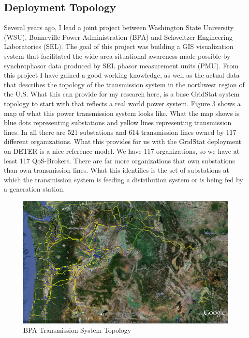 \documentclass{article}
\begin{document}
\subsection {Deployment Topology}


Several years ago, I lead a joint project between Washington State University (WSU), 
Bonneville Power Administration (BPA) and Schweitzer Engineering Laboratories (SEL). 
 The goal of this project was building a GIS visualization system that facilitated the 
wide-area situational awareness made possible by synchrophasor data produced by SEL
 phasor measurement units (PMU).  From this project I have gained a good working 
knowledge, as well as the actual data that describes the topology of the transmission
 system in the northwest region of the U.S.  What this can provide for my research here,
 is a base GridStat system topology to start with that reflects a real world power 
system.  Figure 3 shows a map of what this power transmission system looks like.  What
 the map shows is blue dots representing substations and yellow lines representing 
transmission lines.  In all there are 521 substations and 614 transmission lines owned 
by 117 different organizations.  What this provides for us with the GridStat deployment 
on DETER is a nice reference model.  We have 117 organizations, so we have at least 117 
QoS-Brokers.  There are far more organizations that own substations than own 
transmission lines.  What this identifies is the set of substations at which the 
transmission system is feeding a distribution system or is being fed by a generation 
station. \\

\begin{figure}[h]
\begin{center}
\includegraphics[scale=0.3]{BpaSystem.jpg}
\end{center}
\caption{BPA Transmission System Topology}
\end{figure}
\end{document}
